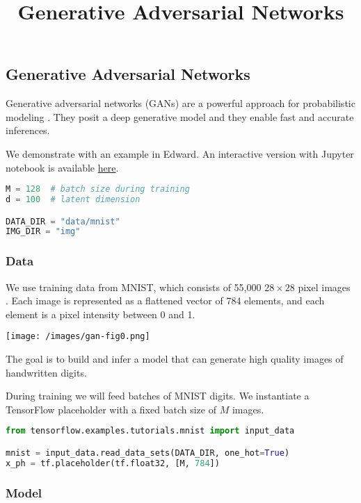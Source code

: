 \title{Generative Adversarial Networks}

\subsection{Generative Adversarial Networks}

Generative adversarial networks (GANs) are a powerful approach for
probabilistic modeling \citep{goodfellow2014generative,goodfellow2016nips}.
They posit a deep generative model and they enable fast and accurate
inferences.

We demonstrate with an example in Edward.
An interactive version with Jupyter notebook is available
\href{http://nbviewer.jupyter.org/github/blei-lab/edward/blob/master/notebooks/gan.ipynb}{here}.

\begin{lstlisting}[language=Python]
M = 128  # batch size during training
d = 100  # latent dimension

DATA_DIR = "data/mnist"
IMG_DIR = "img"
\end{lstlisting}

\subsubsection{Data}

We use training data from MNIST, which consists of 55,000 $28\times
28$ pixel images \citep{lecun1998gradient}. Each image is represented
as a flattened vector of 784 elements, and each element is a pixel
intensity between 0 and 1.

\texttt{[image: /images/gan-fig0.png]}

The goal is to build and infer a model that can generate high quality
images of handwritten digits.

During training we will feed batches of MNIST digits. We instantiate a
TensorFlow placeholder with a fixed batch size of $M$ images.

\begin{lstlisting}[language=Python]
from tensorflow.examples.tutorials.mnist import input_data

mnist = input_data.read_data_sets(DATA_DIR, one_hot=True)
x_ph = tf.placeholder(tf.float32, [M, 784])
\end{lstlisting}


\subsubsection{Model}

